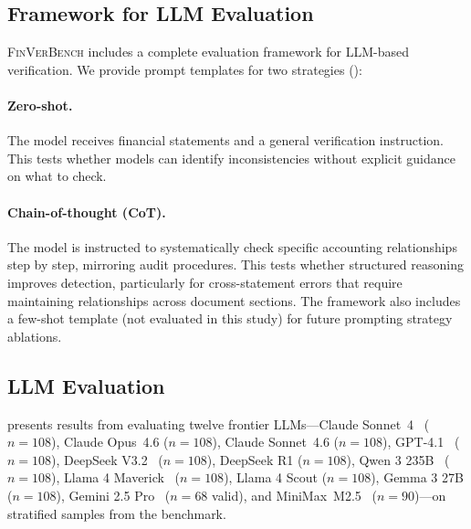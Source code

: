 \documentclass[11pt]{article}
\newcommand{\benchmark}{\textsc{FinVerBench}}
\begin{document}
\subsection{Framework for LLM Evaluation}
\label{sec:results:framework}

\benchmark{} includes a complete evaluation framework for LLM-based verification.
We provide prompt templates for two strategies ():

\paragraph{Zero-shot.}
The model receives financial statements and a general verification instruction.
This tests whether models can identify inconsistencies without explicit guidance on what to check.

\paragraph{Chain-of-thought (CoT).}
The model is instructed to systematically check specific accounting relationships step by step, mirroring audit procedures.
This tests whether structured reasoning improves detection, particularly for cross-statement errors that require maintaining relationships across document sections.
The framework also includes a few-shot template (not evaluated in this study) for future prompting strategy ablations.

\subsection{LLM Evaluation}
\label{sec:results:llm}

 presents results from evaluating twelve frontier LLMs---Claude Sonnet~4~\citep{claude2025} ($n=108$), Claude Opus~4.6 ($n=108$), Claude Sonnet~4.6 ($n=108$), GPT-4.1~\citep{openai2025gpt41} ($n=108$), DeepSeek V3.2~\citep{deepseek2025v3} ($n=108$), DeepSeek R1 ($n=108$), Qwen 3 235B~\citep{qwen2025qwen3} ($n=108$), Llama 4 Maverick~\citep{meta2025llama4} ($n=108$), Llama 4 Scout ($n=108$), Gemma 3 27B ($n=108$), Gemini 2.5 Pro~\citep{google2025gemini} ($n=68$ valid), and MiniMax~M2.5~\citep{minimax2025} ($n=90$)---on stratified samples from the benchmark.
\end{document}
